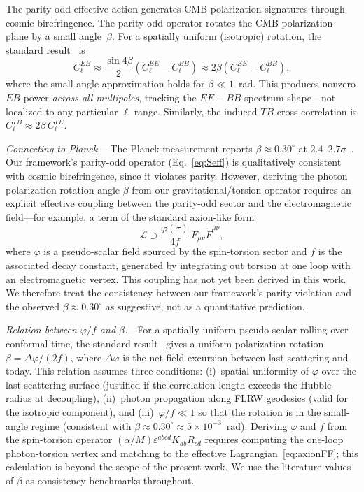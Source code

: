 \documentclass[aps,prd,twocolumn,superscriptaddress,showpacs,preprintnumbers,nofootinbib,longbibliography,floatfix]{revtex4-2}
\begin{document}
The parity-odd effective action generates CMB polarization signatures through cosmic birefringence. The parity-odd operator rotates the CMB polarization plane by a small angle~$\beta$. For a spatially uniform (isotropic) rotation, the standard result~\cite{Minami2020} is
\begin{equation}\label{eq:ClEB}
C_\ell^{EB}\approx \frac{\sin 4\beta}{2}\left(C_\ell^{EE}-C_\ell^{BB}\right) \approx 2\beta\left(C_\ell^{EE}-C_\ell^{BB}\right),
\end{equation}
where the small-angle approximation holds for $\beta\ll 1$~rad. This produces nonzero $EB$ power \textit{across all multipoles}, tracking the $EE-BB$ spectrum shape---not localized to any particular $\ell$ range. Similarly, the induced $TB$ cross-correlation is $C_\ell^{TB}\approx 2\beta\,C_\ell^{TE}$.

\textit{Connecting to Planck.}---The Planck measurement reports $\beta \approx 0.30^\circ$ at $2.4$--$2.7\sigma$~\cite{Minami2020,Eskilt2022}. Our framework's parity-odd operator (Eq.~\ref{eq:Seff}) is qualitatively consistent with cosmic birefringence, since it violates parity. However, deriving the photon polarization rotation angle $\beta$ from our gravitational/torsion operator requires an explicit effective coupling between the parity-odd sector and the electromagnetic field---for example, a term of the standard axion-like form
\begin{equation}\label{eq:axionFF}
\mathcal{L}\supset \frac{\varphi(\tau)}{4f}\,F_{\mu\nu}\tilde{F}^{\mu\nu},
\end{equation}
where $\varphi$ is a pseudo-scalar field sourced by the spin-torsion sector and $f$ is the associated decay constant, generated by integrating out torsion at one loop with an electromagnetic vertex. This coupling has not yet been derived in this work. We therefore treat the consistency between our framework's parity violation and the observed $\beta\approx 0.30^\circ$ as suggestive, not as a quantitative prediction.

\textit{Relation between $\varphi/f$ and $\beta$.}---For a spatially uniform pseudo-scalar rolling over conformal time, the standard result~\cite{CarrollFieldJackiw1990,Carroll1998} gives a uniform polarization rotation $\beta = \Delta\varphi/(2f)$, where $\Delta\varphi$ is the net field excursion between last scattering and today. This relation assumes three conditions: (i)~spatial uniformity of $\varphi$ over the last-scattering surface (justified if the correlation length exceeds the Hubble radius at decoupling), (ii)~photon propagation along FLRW geodesics (valid for the isotropic component), and (iii)~$\varphi/f\ll 1$ so that the rotation is in the small-angle regime (consistent with $\beta\approx 0.30^\circ \approx 5\times 10^{-3}$~rad). Deriving $\varphi$ and $f$ from the spin-torsion operator $(\alpha/M)\varepsilon^{abcd}K_{ab}R_{cd}$ requires computing the one-loop photon-torsion vertex and matching to the effective Lagrangian~\eqref{eq:axionFF}; this calculation is beyond the scope of the present work. We use the literature values of $\beta$ as consistency benchmarks throughout.
\end{document}
